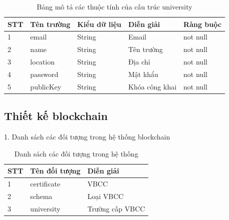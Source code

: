 \begin{table}[H]
\caption{Bảng mô tả các thuộc tính của cấu trúc university}
	\label{table:university}
	\begin{tabularx} {\textwidth} {|p{1cm}|p{3cm}|p{3cm}|X|p{2cm}|}
\hline
		STT &	Tên trường & Kiểu dữ liệu & Diễn giải & Ràng buộc \\ \hline
		1 & email	& String & Email  & not null \\ \hline
		2 & name & String  & Tên trường   & not null \\ \hline
		3 & location	&  String & Địa chỉ  &not null \\ \hline
		4 & password	& String & Mật khẩu  &not null \\ \hline
		5 & publicKey	& String & Khóa công khai   &not null \\ \hline
\end{tabularx}
\end{table}

\subsection{Thiết kế blockchain}

1. Danh sách các đối tượng trong hệ thống blockchain


\begin{table}[H]
\caption{Danh sách các đối tượng trong hệ thống}
	\label{table:asset}
	\begin{tabularx} {\textwidth} {|p{1cm}|p{3cm}|X|}
\hline
		STT &	Tên đối tượng &  Diễn giải \\ \hline
		1 & certificate	& VBCC  \\ \hline
		2 & schema  &  Loại VBCC  \\ \hline
		3 & university	&  Trường cấp VBCC  \\ \hline
\end{tabularx}
\end{table}

